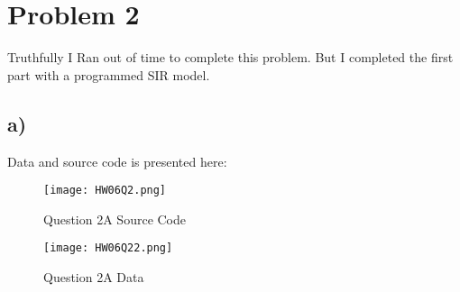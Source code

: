 \documentclass{article}
\numberwithin{equation}{section}
\begin{document}
\section*{Problem 2}
Truthfully I Ran out of time to complete this problem. But I completed the first part with a programmed SIR model.
\subsection*{a)}

Data and source code is presented here:

\begin{figure}[hbt!]
\centering
\texttt{[image: HW06Q2.png]}
\caption{Question 2A Source Code}
\end{figure}

\begin{figure}[hbt!]
\centering
\texttt{[image: HW06Q22.png]}
\caption{Question 2A Data}
\end{figure}
\end{document}
